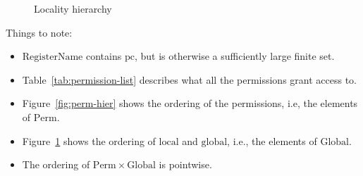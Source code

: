 \documentclass[a4paper]{article}
\newcommand{\pcreg}{\mathrm{pc}}
\newcommand{\plaindom}[1]{\mathrm{#1}}
\newcommand{\RegName}{\plaindom{RegisterName}}
\newcommand{\Perms}{\plaindom{Perm}}
\newcommand{\Globals}{\plaindom{Global}}
\newcommand{\plainperm}[1]{\mathrm{#1}}
\newcommand{\local}{\plainperm{local}}
\newcommand{\glob}{\plainperm{global}}
\begin{document}
\begin{figure}[!h]
  \centering
  \caption{Locality hierarchy}
  \label{fig:glob-hier}
\end{figure}

Things to note:
\begin{itemize}
\item $\RegName$ contains $\pcreg$, but is otherwise a sufficiently
  large finite set.
\item Table~\ref{tab:permission-list} describes what all the permissions grant access to.
\item Figure~\ref{fig:perm-hier} shows the ordering of the permissions, i.e, the elements of $\Perms$.
\item Figure~\ref{fig:glob-hier} shows the ordering of $\local$ and $\glob$, i.e., the elements of $\Globals$.
\item The ordering of $\Perms \times \Globals$ is pointwise.
\end{itemize}
\end{document}
